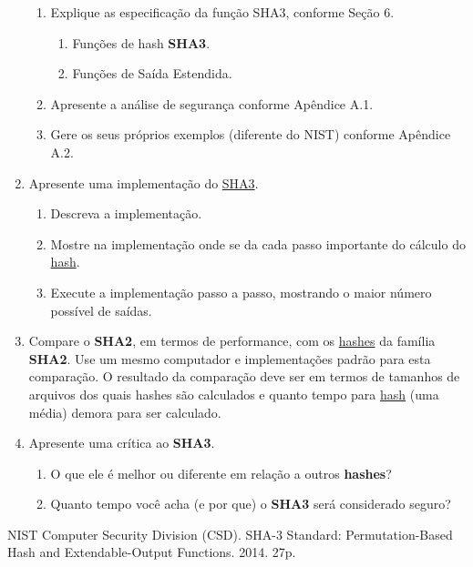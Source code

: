 \documentclass[conference]{IEEEtran}
\begin{document}
\begin{enumerate}
\begin{enumerate}
\item Explique as especificação da função SHA3, conforme Seção 6.

\begin{enumerate}

\item Funções de hash \textbf{SHA3}.

\item Funções de Saída Estendida.

\end{enumerate}

\item Apresente a análise de segurança conforme Apêndice A.1.

\item Gere os seus próprios exemplos (diferente do NIST) conforme Apêndice A.2.

\end{enumerate}

\item Apresente uma implementação do \underline{SHA3}.

\begin{enumerate}

\item Descreva a implementação.

\item Mostre na implementação onde se da cada passo importante do cálculo do
\underline{hash}.

\item Execute a implementação passo a passo, mostrando o maior número possível
de saídas.

\end{enumerate}

\item Compare o \textbf{SHA2}, em termos de performance, com os
\underline{hashes} da família \textbf{SHA2}. Use um mesmo computador e
implementações padrão para esta comparação. O resultado da comparação deve ser
em termos de tamanhos de arquivos dos quais hashes são calculados e quanto tempo
para \underline{hash} (uma média) demora para ser calculado.

\item Apresente uma crítica ao \textbf{SHA3}.

\begin{enumerate}

\item O que ele é melhor ou diferente em relação a outros \textbf{hashes}?

\item Quanto tempo você acha (e por que) o \textbf{SHA3} será considerado
seguro?

\end{enumerate}

\end{enumerate}

\begin{thebibliography}{9}

 NIST Computer Security Division (CSD). SHA-3 Standard:
Permutation-Based Hash and Extendable-Output Functions. 2014. 27p.



\end{thebibliography}

\smallskip
\end{document}
